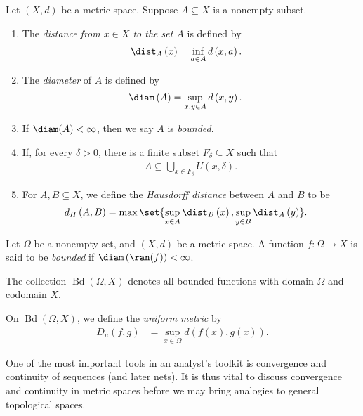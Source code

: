 \begin{definition}
  Let $\left(X,d\right)$ be a metric space. Suppose $A\subseteq X$ is a nonempty subset.
  \begin{enumerate}[(1)]
    \item The \textit{distance from $x\in X$ to the set $A$} is defined by
      \begin{align*}
        \dist_{A}\left(x\right) &= \inf_{a\in A}d\left(x,a\right).
      \end{align*}
    \item The \textit{diameter} of $A$ is defined by
      \begin{align*}
        \diam\left(A\right) &= \sup_{x,y\in A}d\left(x,y\right).
      \end{align*}
    \item If $\diam(A) < \infty$, then we say $A$ is \textit{bounded}.
    \item If, for every $\delta > 0$, there is a finite subset $F_{\delta}\subseteq X$ such that
      \begin{align*}
        A\subseteq \bigcup_{x\in F_{\delta}}U\left(x,\delta\right).
      \end{align*}
    \item For $A,B\subseteq X$, we define the \textit{Hausdorff distance} between $A$ and $B$ to be
      \begin{align*}
        d_{H}\left(A,B\right) &= \max\set{\sup_{x\in A}\dist_{B}\left(x\right),\sup_{y\in B}\dist_{A}\left(y\right)}.
      \end{align*}
  \end{enumerate}
\end{definition}
\begin{example}
  Let $\Omega$ be a nonempty set, and $\left(X,d\right)$ be a metric space. A function $f\colon \Omega\rightarrow X$ is said to be \textit{bounded} if $\diam\left(\ran(f)\right) < \infty$.\newline

  The collection $\operatorname{Bd}\left(\Omega,X\right)$ denotes all bounded functions with domain $\Omega$ and codomain $X$.\newline

  On $ \operatorname{Bd}\left(\Omega,X\right)$, we define the \textit{uniform metric} by
  \begin{align*}
    D_{u}\left(f,g\right) &= \sup_{x\in\Omega}d\left(f(x),g(x)\right).
  \end{align*}
\end{example}
One of the most important tools in an analyst's toolkit is convergence and continuity of sequences (and later nets). It is thus vital to discuss convergence and continuity in metric spaces before we may bring analogies to general topological spaces.

